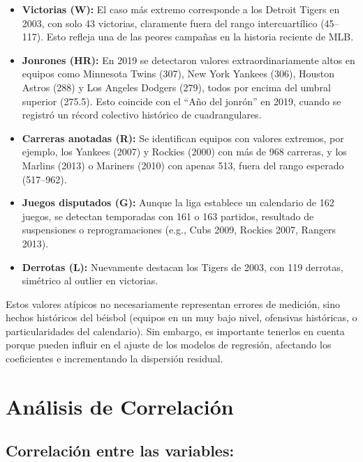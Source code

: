 \documentclass[man,floatsintext]{apa7}
\begin{document}
\begin{itemize}
    \item \textbf{Victorias (W):} El caso más extremo corresponde a los Detroit Tigers en 2003, con solo 43 victorias, claramente fuera del rango intercuartílico (45--117). Esto refleja una de las peores campañas en la historia reciente de MLB.
    \item \textbf{Jonrones (HR):} En 2019 se detectaron valores extraordinariamente altos en equipos como Minnesota Twins (307), New York Yankees (306), Houston Astros (288) y Los Angeles Dodgers (279), todos por encima del umbral superior (275.5). Esto coincide con el ``Año del jonrón'' en 2019, cuando se registró un récord colectivo histórico de cuadrangulares.
    \item \textbf{Carreras anotadas (R):} Se identifican equipos con valores extremos, por ejemplo, los Yankees (2007) y Rockies (2000) con más de 968 carreras, y los Marlins (2013) o Mariners (2010) con apenas 513, fuera del rango esperado (517--962).
    \item \textbf{Juegos disputados (G):} Aunque la liga establece un calendario de 162 juegos, se detectan temporadas con 161 o 163 partidos, resultado de suspensiones o reprogramaciones (e.g., Cubs 2009, Rockies 2007, Rangers 2013).
    \item \textbf{Derrotas (L):} Nuevamente destacan los Tigers de 2003, con 119 derrotas, simétrico al outlier en victorias.
\end{itemize}

Estos valores atípicos no necesariamente representan errores de medición, sino hechos históricos del béisbol (equipos en un muy bajo nivel, ofensivas históricas, o particularidades del calendario). Sin embargo, es importante tenerlos en cuenta porque pueden influir en el ajuste de los modelos de regresión, afectando los coeficientes e incrementando la dispersión residual.
\section{Análisis de Correlación}
\subsection{Correlación entre las variables:}
\end{document}
